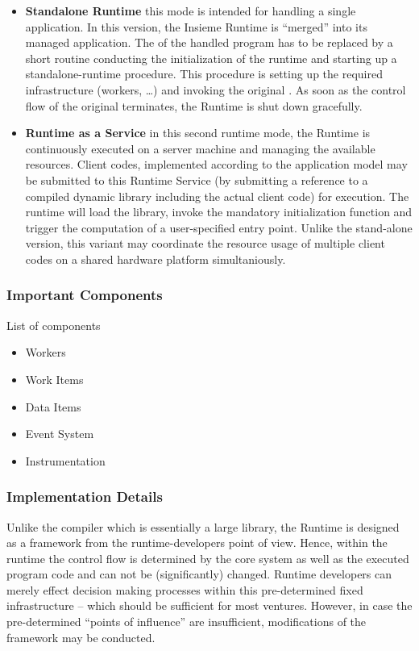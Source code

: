 \begin{itemize}
  \item \textbf{Standalone Runtime} this mode is
  intended for handling a single application. In this version, the Insieme
  Runtime is ``merged'' into its managed application. The  of
  the handled program has to be replaced by a short routine conducting the
  initialization of the runtime and starting up a standalone-runtime procedure.
  This procedure is setting up the required infrastructure (workers, \ldots) and
  invoking the original . As soon as the control flow of the
  original  terminates, the Runtime is shut down gracefully.
   
  \item \textbf{Runtime as a Service}
  in this second runtime mode, the Runtime is continuously executed on a server
  machine and managing the available resources. Client codes, implemented
  according to the application model may be submitted to this Runtime Service
  (by submitting a reference to a compiled dynamic library including the actual
  client code) for execution. The runtime will load the library, invoke the
  mandatory initialization function and trigger the computation of a
  user-specified entry point. Unlike the stand-alone version, this variant may
  coordinate the resource usage of multiple client codes on a shared hardware
  platform simultaniously.
\end{itemize} 

\subsubsection{Important Components}
List of components
\begin{itemize}
  \item Workers
  \item Work Items
  \item Data Items
  \item Event System
  \item Instrumentation
\end{itemize}

\subsubsection{Implementation Details}
Unlike the compiler which is essentially a large library, the Runtime is
designed as a framework from the runtime-developers point of view. Hence, within
the runtime the control flow is determined by the core system as well as the
executed program code and can not be (significantly) changed. Runtime developers
can merely effect decision making processes within this pre-determined fixed infrastructure
-- which should be sufficient for most ventures. However, in case the
pre-determined ``points of influence'' are insufficient, modifications of the
framework may be conducted.

